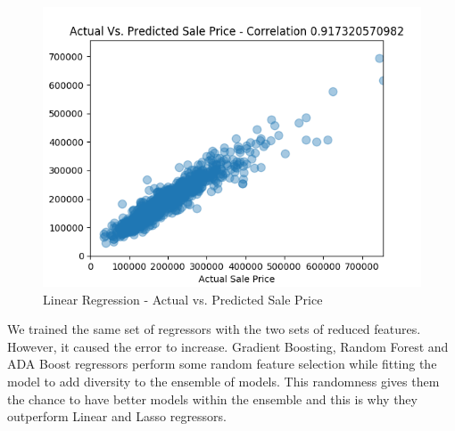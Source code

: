 \documentclass[conference,compsoc]{IEEEtran}
\begin{document}
\begin{figure}[!h]
  \includegraphics[width=\linewidth,natwidth=578,natheight=428]{Linear.png}
  \caption{Linear Regression - Actual vs. Predicted Sale Price}
  \label{fig:linearregpred}
\end{figure}




\par
We trained the same set of regressors with the two sets of reduced features. However, it caused the error to increase. Gradient Boosting, Random Forest and ADA Boost regressors perform some random feature selection while fitting the model to add diversity to the ensemble of models. This randomness gives them the chance to have better models within the ensemble and this is why they outperform Linear and Lasso regressors. 
\end{document}
